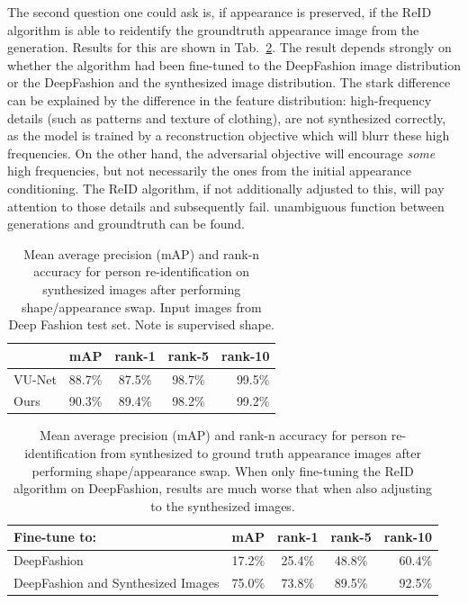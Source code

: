 		The second question one could ask is, if appearance is preserved, \ie if the ReID algorithm is able to reidentify the groundtruth appearance image from the generation. Results for this are shown in Tab.~\ref{tab:reiddirect}. The result depends strongly on whether the algorithm had been fine-tuned to the DeepFashion image distribution or the DeepFashion and the synthesized image distribution. The stark difference can be explained by the difference in the feature distribution: high-frequency details (such as patterns and texture of clothing), are not synthesized correctly, as the model is trained by a reconstruction objective which will blurr these high frequencies. On the other hand, the adversarial objective will encourage \textit{some} high frequencies, but not necessarily the ones from the initial appearance conditioning. The ReID algorithm, if not additionally adjusted to this, will pay attention to those details and subsequently fail.
		unambiguous function between generations and groundtruth can be found.

		\begin{table}[htp]
			\centering
			\caption{Mean average precision (mAP) and rank-n accuracy for person re-identification on synthesized images after performing shape/appearance swap. Input images from Deep Fashion test set. Note \cite{esser18} is supervised \wrt shape.}
			\label{tab:reid}
			\begin{tabular}{l|cccr}
				\hline
				& mAP & rank-1 & rank-5 & rank-10 \\ \hline
				VU-Net \cite{esser18} & 88.7\% & 87.5\% & {98.7}\% & {99.5}\% \\
				Ours & {90.3}\% & {89.4}\% &{98.2}\% & {99.2}\% \\ \hline
			\end{tabular}
		\end{table}

		\begin{table}[htp]
			\centering
			\caption{Mean average precision (mAP) and rank-n accuracy for person re-identification from synthesized to ground truth appearance images after performing shape/appearance swap. When only fine-tuning the ReID algorithm on DeepFashion, results are much worse that when also adjusting to the synthesized images.}
			\label{tab:reiddirect}
			\begin{tabular}{l|cccr}
				\hline
				Fine-tune to: & mAP & rank-1 & rank-5 & rank-10 \\ \hline
				DeepFashion & {17.2}\% & {25.4}\% &{48.8}\% & {60.4}\% \\
				DeepFashion and Synthesized Images& {75.0}\% & {73.8}\% &{89.5}\% & {92.5}\% \\ \hline
			\end{tabular}
		\end{table}

